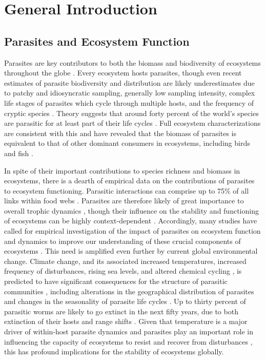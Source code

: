 \chapter{General Introduction}
\label{chap:intro}

%
% 

\section{Parasites and Ecosystem Function}
Parasites are key contributors to both the biomass and biodiversity of ecosystems throughout the globe \citep{dobson2008,amundsen2009, jorge2018}. Every ecosystem hosts parasites, though even recent estimates of parasite biodiversity and distribution are likely underestimates due to patchy and idiosyncratic sampling, generally low sampling intensity, complex life stages of parasites which cycle through multiple hosts, and the frequency of cryptic species \citep{dallas2017, jorge2018, poulin2018the}. Theory suggests that around forty percent of the world’s species are parasitic for at least part of their life cycles \citep{dobson2008}. Full ecosystem characterizations are consistent with this \citep{lafferty2006parasites, lafferty2006food,kruis2008,grabner2017} and have revealed that the biomass of parasites is equivalent to that of other dominant consumers in ecosystems, including birds and fish \citep{kruis2008}. 

In spite of their important contributions to species richness and biomass in ecosystems, there is a dearth of empirical data on the contributions of parasites to ecosystem functioning. Parasitic interactions can comprise up to 75\% of all links within food webs \citep{sukhdeo2012,dunne2013}. Parasites are therefore likely of great importance to overall trophic dynamics \citep{hernandez2008,amundsen2009}, though their influence on the stability and functioning of ecosystems can be highly context-dependent \citep{benesh2008, perrot2014}. Accordingly, many studies have called for empirical investigation of the impact of parasites on ecosystem function and dynamics to improve our understanding of these crucial components of ecosystems \citep{blasco2017, carlson2017, vannatta2018}. This need is amplified even further by current global environmental change. Climate change, and its associated increased temperatures, increased frequency of disturbances, rising sea levels, and altered chemical cycling \citep{ipcc2014}, is predicted to have significant consequences for the structure of parasitic communities \citep{brooks2007, dobson2008}, including alterations in the geographical distribution of parasites and changes in the seasonality of parasite life cycles \citep{lafferty2009}. Up to thirty percent of parasitic worms are likely to  go extinct in the next fifty years, due to both extinction of their hosts and range shifts \citep{carlson2017}. Given that temperature is a major driver of within-host parasite dynamics \citep{kirk2018} and parasites play an important role in influencing the capacity of ecosystems to resist and recover from disturbances \citep{brooks2007}, this has profound implications for the stability of ecosystems globally.

